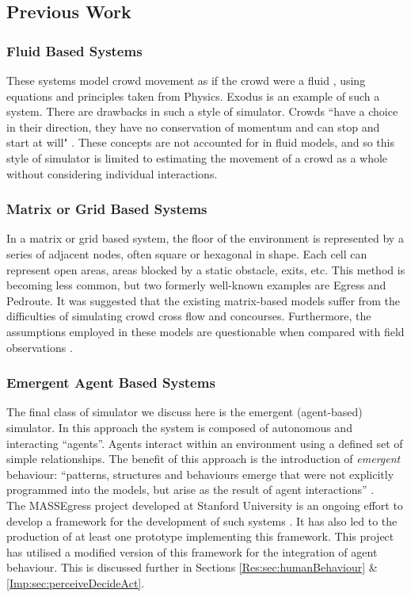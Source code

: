 \subsection{Previous Work}

\subsubsection{Fluid Based Systems}
These systems model crowd movement as if the crowd were a fluid \cite{WikipediaFluidMechanics}, using equations and principles taken from Physics. 
Exodus \cite{GaleaNumericalSimulation,GaleaMathModelling} is an example of such a system. There are drawbacks in such a style 
of simulator. Crowds ``have a choice in their direction, they have no conservation of momentum and can stop and start at will" \cite{StillCrowdDynamics}. 
These concepts are not accounted for in fluid models, and so this style of simulator is limited to estimating the movement of a crowd as a whole without
considering individual interactions.

\subsubsection{Matrix or Grid Based Systems}
In a matrix or grid based system, the floor of the environment is represented by a series of adjacent nodes, often square or hexagonal in shape. Each 
cell can represent open areas, areas blocked by a static obstacle, exits, etc. This method is becoming less common, but two formerly well-known examples are 
Egress and Pedroute. It was suggested that the existing matrix-based models suffer from the
difficulties of simulating crowd cross flow and concourses. Furthermore, the
assumptions employed in these models are questionable when compared with field observations \cite{StillCrowdDynamics}.

\subsubsection{Emergent Agent Based Systems}
The final class of simulator we discuss here is the emergent (agent-based) simulator. In this approach the system is composed of autonomous
and interacting ``agents''. Agents interact within an environment using a defined set of simple relationships. The benefit of this approach is the introduction
of \emph{emergent} behaviour: ``patterns, structures and behaviours emerge that were not explicitly programmed into the models, but arise as the 
result of agent interactions'' \cite{AgentBasedTutorial}.\\
The MASSEgress project developed at Stanford University is an ongoing effort to develop a framework for the development of such systems \cite{MultiAgentFramework}.
It has also led to the production of at least one prototype implementing this framework. 
This project has utilised a modified version of this framework for the integration
of agent behaviour. This is discussed further in Sections \ref{Res:sec:humanBehaviour} & \ref{Imp:sec:perceiveDecideAct}.


